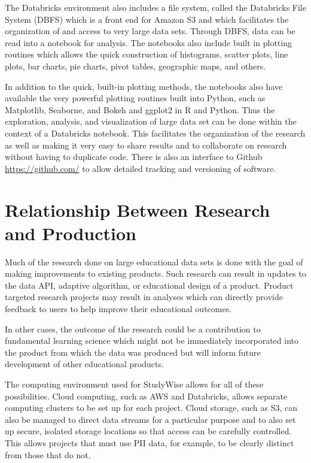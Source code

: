 \documentclass[runningheads,a4paper]{llncs}
\begin{document}
The Databricks environment also includes a file system, called the Databricks File System (DBFS) which is a front end for Amazon S3 and which facilitates the organization of and access to very large data sets.  Through DBFS, data can be read into a notebook for analysis.  The notebooks also include built in plotting routines which allows the quick construction of histograms, scatter plots, line plots, bar charts, pie charts, pivot tables, geographic maps, and others.

In addition to the quick, built-in plotting methods, the notebooks also have available the very powerful plotting routines built into Python, such as Matplotlib, Seaborne, and Bokeh and ggplot2 in R and Python.  Thus the exploration, analysis, and visualization of large data set can be done within the context of a Databricks notebook.   This facilitates the organization of the research as well as making it very easy to share results and to collaborate on research without having to duplicate code.  There is also an interface to Github \url{https://github.com/} to allow detailed tracking and versioning of software.
  
\section{Relationship Between Research and Production}

Much of the research done on large educational data sets is done with the goal of making improvements to existing products.  Such research can result in updates to the data API, adaptive algorithm, or educational design of a product.  Product targeted research projects may result in analyses which can directly provide feedback to users to help improve their educational outcomes.

In other cases, the outcome of the research could be a contribution to fundamental learning science which might not be immediately incorporated into the product from which the data was produced but will inform future development of other educational products.

The computing environment used for StudyWise allows for all of these possibilities.  Cloud computing, such as AWS and Databricks, allows separate computing clusters to be set up for each project.  Cloud storage, such as S3, can also be managed to direct data streams for a particular purpose and to also set up secure, isolated storage locations so that access can be carefully controlled.  This allows projects that must use PII data, for example, to be clearly distinct from those that do not.
\end{document}
